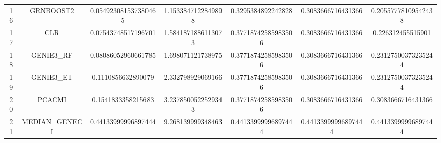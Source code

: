 \documentclass[a4paper,10pt]{article}
\begin{document}
\begin{landscape}
\begin{table}[!htp]
\begin{tabular}{ccccccc}
16&GRNBOOST2&0.054923081537380465&1.1533847122849898&0.3295384892242828&0.3083666716431366&0.20557778109542438\\
17&CLR&0.07543748517196701&1.5841871886113073&0.37718742585983506&0.3083666716431366&0.226312455515901\\
18&GENIE3_RF&0.08086052960661785&1.698071121738975&0.37718742585983506&0.3083666716431366&0.23127500373235244\\
19&GENIE3_ET&0.1110856632890079&2.332798929069166&0.37718742585983506&0.3083666716431366&0.23127500373235244\\
20&PCACMI&0.1541833358215683&3.2378500522529343&0.37718742585983506&0.3083666716431366&0.3083666716431366\\
21&MEDIAN_GENECI&0.44133999996897444&9.268139999348463&0.44133999996897444&0.44133999996897444&0.44133999996897444\\
\hline
\end{tabular}
\end{table}


\end{landscape}
\end{document}
